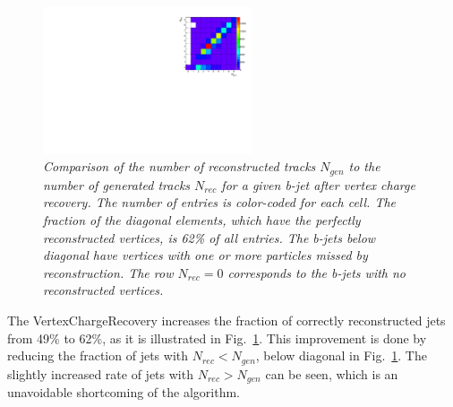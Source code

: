 \begin{figure}[h]
{\centering
    \includegraphics[width=0.55\textwidth]{ILD/plots/recovery-table.pdf}
    \caption{\sl Comparison of the number of reconstructed tracks $N_{gen}$ to the number of generated tracks $N_{rec}$ for a given b-jet after vertex charge recovery. The number of entries is color-coded for each cell. The fraction of the diagonal elements, which have the perfectly reconstructed vertices, is 62\% of all entries. The b-jets below diagonal have vertices with one or more particles missed by reconstruction. The row $N_{rec} = 0$ corresponds to the b-jets with no reconstructed vertices. %
    }
    \label{fig:RecoveryTable_3}
  }
\end{figure}


The VertexChargeRecovery increases the fraction of correctly reconstructed jets from 49\% to 62\%, as it is illustrated in Fig.~\ref{fig:RecoveryTable_3}. 
This improvement is done by reducing the fraction of jets with $N_{rec} < N_{gen}$, below diagonal in Fig.~\ref{fig:RecoveryTable_3}. 
The slightly increased rate of jets with $N_{rec} > N_{gen}$ can be seen, which is an unavoidable shortcoming of the algorithm. 



